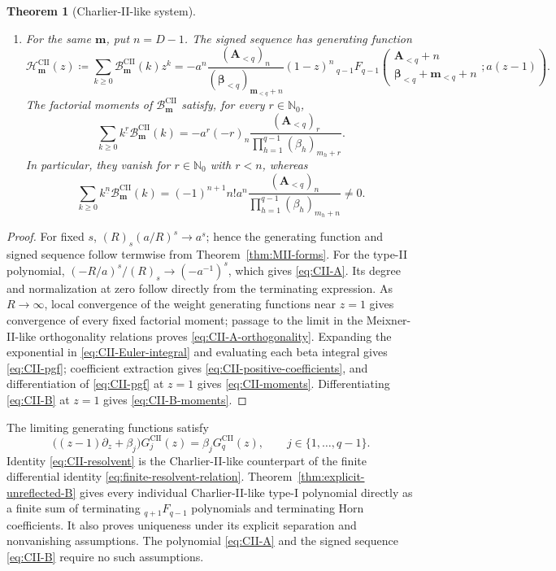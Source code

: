 \documentclass[10pt]{amsart}
\newcommand{\Nzero}{\mathbb N_0}
\newcommand{\A}{\boldsymbol A}
\newcommand{\bbeta}{\boldsymbol\beta}
\newcommand{\mm}{\boldsymbol m}
\newcommand{\fall}[2]{#1^{\underline{#2}}}
\newcommand{\pFq}[5]{{}_{#1}F_{#2}\!\left(\begin{matrix}#3\\#4\end{matrix};#5\right)}
\theoremstyle{plain}
\newtheorem{theorem}{Theorem}[section]
\theoremstyle{definition}
\theoremstyle{remark}
\begin{document}
\begin{theorem}[Charlier-II-like system]
\begin{enumerate}[label=\textnormal{(\roman*)}]
\item For the same \(\mm\), put \(n=D-1\). The signed sequence has
generating function
\begin{equation}
 \mathcal H_{\mm}^{\mathrm{CII}}(z)
 \coloneq\sum_{k\ge0}\mathcal B_{\mm}^{\mathrm{CII}}(k)z^k
 =-a^n\frac{(\A_{<q})_n}{(\bbeta_{<q})_{\mm_{<q}+n}}(1-z)^n
 \,\pFq{q-1}{q-1}
 {\A_{<q}+n}{\bbeta_{<q}+\mm_{<q}+n}{a(z-1)}.
 \label{eq:CII-B}
\end{equation}
The factorial moments of \(\mathcal B_{\mm}^{\mathrm{CII}}\) satisfy,
for every \(r\in\Nzero\),
\begin{equation}
 \sum_{k\ge0}\fall{k}{r}\mathcal B_{\mm}^{\mathrm{CII}}(k)
 =
 -a^r(-r)_n\frac{(\A_{<q})_r}
 {\prod_{h=1}^{q-1}(\beta_h)_{m_h+r}}.
 \label{eq:CII-B-moments}
\end{equation}
In particular, they vanish for \(r\in\Nzero\) with \(r<n\), whereas
\begin{equation}
 \sum_{k\ge0}\fall{k}{n}\mathcal B_{\mm}^{\mathrm{CII}}(k)
 =(-1)^{n+1}n!a^n
 \frac{(\A_{<q})_n}{\prod_{h=1}^{q-1}(\beta_h)_{m_h+n}}\ne0.
 \label{eq:CII-B-leading-moment}
\end{equation}
\end{enumerate}
\end{theorem}

\begin{proof}
For fixed \(s\), \((R)_s(a/R)^s\to a^s\); hence the generating function
and signed sequence follow termwise from Theorem~\ref{thm:MII-forms}.
For the type-II polynomial, \((-R/a)^s/(R)_s\to(-a^{-1})^s\), which gives
\eqref{eq:CII-A}. Its degree and normalization at zero follow
directly from the terminating expression. As \(R\to\infty\), local convergence of the weight
generating functions near \(z=1\) gives convergence of every fixed
factorial moment; passage to the limit in the Meixner-II-like orthogonality
relations proves \eqref{eq:CII-A-orthogonality}. Expanding the exponential
in \eqref{eq:CII-Euler-integral} and evaluating each beta integral gives
\eqref{eq:CII-pgf}; coefficient extraction gives
\eqref{eq:CII-positive-coefficients}, and differentiation of
\eqref{eq:CII-pgf} at \(z=1\) gives \eqref{eq:CII-moments}. Differentiating
\eqref{eq:CII-B} at \(z=1\) gives \eqref{eq:CII-B-moments}.
\end{proof}

The limiting generating functions satisfy
\begin{equation}
 \bigl((z-1)\partial_z+\beta_j\bigr)G_j^{\mathrm{CII}}(z)
 =\beta_jG_q^{\mathrm{CII}}(z),\qquad
 j\in\{1,\ldots,q-1\}.
 \label{eq:CII-resolvent}
\end{equation}
Identity \eqref{eq:CII-resolvent} is the Charlier-II-like
counterpart of the finite differential identity
\eqref{eq:finite-resolvent-relation}.
Theorem~\ref{thm:explicit-unreflected-B} gives every individual
Charlier-II-like type-I polynomial directly as a finite sum of
terminating \({}_{q+1}F_{q-1}\) polynomials and terminating Horn
coefficients.
It also proves uniqueness under its explicit separation and nonvanishing
assumptions.  The polynomial \eqref{eq:CII-A} and the signed sequence
\eqref{eq:CII-B} require no such assumptions.
\end{document}
